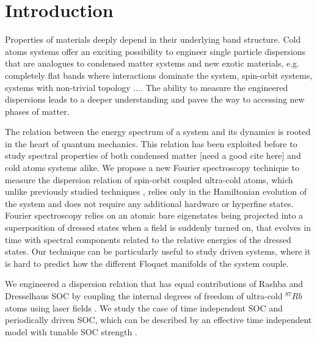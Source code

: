 \section{Introduction}

Properties of materials deeply depend in their underlying band structure. Cold atoms systems offer an exciting possibility to engineer single particle dispersions that are analogues to condensed matter systems and new exotic materials, e.g. completely flat bands where interactions dominate the system, spin-orbit systems, systems with non-trivial topology \cite{lindner_floquet_2011,radic_strong_2015}.... The ability to measure the engineered dispersions leads to a deeper understanding and paves the way to accessing new phases of matter. 
 
The relation between the energy spectrum of a system and its dynamics is rooted in the heart of quantum mechanics.  This relation has been exploited before to study spectral properties of both condensed matter [need a good cite here] and cold atoms systems \cite{yoshimura_diabatic-ramping_2014,wang_atom-interferometric_2015} alike. We propose a new Fourier spectroscopy technique to measure the dispersion relation of spin-orbit coupled ultra-cold atoms, which unlike previously studied techniques \cite{cheuk_spin-injection_2012}, relies only in the Hamiltonian evolution of the system and does not require any additional hardware or hyperfine states. Fourier spectroscopy relies on an atomic bare eigenstates being projected into a superposition of dressed states when a field is suddenly turned on, that evolves in time with spectral components related to the relative energies of the dressed states. Our technique can be particularly useful to study driven systems, where it is hard to predict how the different Floquet manifolds of the system couple. 

We engineered a dispersion relation that has equal contributions of Rashba and Dresselhaus SOC by coupling the internal degrees of freedom of ultra-cold $^{87}Rb$ atoms using laser fields \cite{dalibard_textitcolloquium_2011}. We study the case of time independent SOC and periodically driven SOC, which can be described by an effective time independent model with tunable SOC strength \cite{jimenez-garcia_tunable_2015}.

